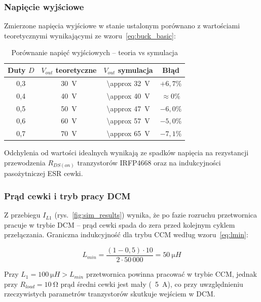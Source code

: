\documentclass[12pt,a4paper]{article}
\begin{document}
\subsubsection{Napięcie wyjściowe}

Zmierzone napięcia wyjściowe w stanie ustalonym porównano z wartościami teoretycznymi
wynikającymi ze wzoru~\eqref{eq:buck_basic}:

\begin{table}[H]
    \centering
    \caption{Porównanie napięć wyjściowych -- teoria vs symulacja}
    \label{tab:vout}
    \begin{tabular}{cccc}
        \toprule
        \textbf{Duty} $D$ & $V_{out}$ teoretyczne & $V_{out}$ symulacja & \textbf{Błąd} \\
        \midrule
        0,3 & \SI{30}{V} & \SI{\approx 32}{V} & $+6{,}7\%$ \\
        0,4 & \SI{40}{V} & \SI{\approx 40}{V} & $\approx 0\%$ \\
        0,5 & \SI{50}{V} & \SI{\approx 47}{V} & $-6{,}0\%$ \\
        0,6 & \SI{60}{V} & \SI{\approx 57}{V} & $-5{,}0\%$ \\
        0,7 & \SI{70}{V} & \SI{\approx 65}{V} & $-7{,}1\%$ \\
        \bottomrule
    \end{tabular}
\end{table}

Odchylenia od wartości idealnych wynikają ze spadków napięcia na rezystancji
przewodzenia $R_{DS(on)}$ tranzystorów IRFP4668 oraz na indukcyjności pasożytniczej ESR cewki.

\subsubsection{Prąd cewki i tryb pracy DCM}

Z przebiegu $I_{L1}$ (rys.~\ref{fig:sim_results}) wynika, że po fazie rozruchu
przetwornica pracuje w trybie DCM -- prąd cewki spada do zera przed kolejnym
cyklem przełączania. Graniczna indukcyjność dla trybu CCM według wzoru~\eqref{eq:lmin}:

\begin{equation}
    L_{min} = \frac{(1-0{,}5) \cdot 10}{2 \cdot 50\,000} = \SI{50}{\micro H}
\end{equation}

Przy $L_1 = \SI{100}{\micro H} > L_{min}$ przetwornica powinna pracować w trybie CCM,
jednak przy $R_{load} = \SI{10}{\ohm}$ prąd średni cewki jest mały (~\SI{5}{A}),
co przy uwzględnieniu rzeczywistych parametrów tranzystorów skutkuje wejściem w DCM.
\end{document}
